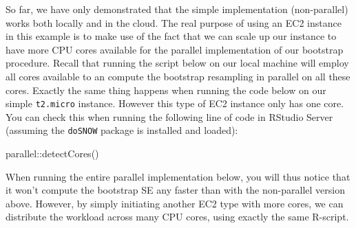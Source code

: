 \documentclass[
  12pt,
]{style/krantz}
\newenvironment{Shaded}{\begin{snugshade}}{\end{snugshade}}
\newcommand{\FunctionTok}[1]{\textcolor[rgb]{0.00,0.00,0.00}{#1}}
\newcommand{\NormalTok}[1]{#1}
\newcommand{\SpecialCharTok}[1]{\textcolor[rgb]{0.00,0.00,0.00}{#1}}
\begin{document}
So far, we have only demonstrated that the simple implementation (non-parallel) works both locally and in the cloud. The real purpose of using an EC2 instance in this example is to make use of the fact that we can scale up our instance to have more CPU cores available for the parallel implementation of our bootstrap procedure. Recall that running the script below on our local machine will employ all cores available to an compute the bootstrap resampling in parallel on all these cores. Exactly the same thing happens when running the code below on our simple \texttt{t2.micro} instance. However this type of EC2 instance only has one core. You can check this when running the following line of code in RStudio Server (assuming the \texttt{doSNOW} package is installed and loaded):

\begin{Shaded}
\begin{Highlighting}[]
\NormalTok{parallel}\SpecialCharTok{::}\FunctionTok{detectCores}\NormalTok{()}
\end{Highlighting}
\end{Shaded}

When running the entire parallel implementation below, you will thus notice that it won't compute the bootstrap SE any faster than with the non-parallel version above. However, by simply initiating another EC2 type with more cores, we can distribute the workload across many CPU cores, using exactly the same R-script.
\end{document}
